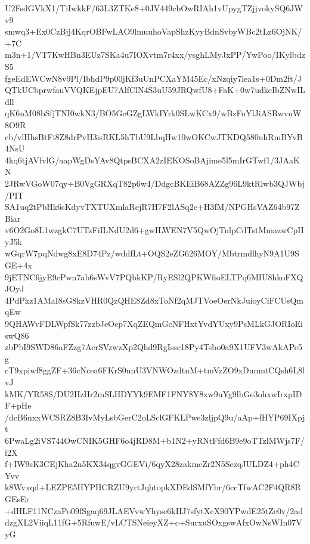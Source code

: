 U2FsdGVkX1/TiIwkkF/63L3ZTKe8+0JV449cbOwRIAh1vUpygTZjjvokySQ6JWv9
smwq3+Ex0CzBjj4KqrOBFwLAO9lmuuhoVapShzKyyBdnSvbyWBc2tLz6OjNK/+7C
m3n+1/VT7KwHBn3EUz7SKa4u7IOXvtm7r4xx/ysghLMyJxPP/YwPoo/IKylbdzS5
fgeEdEWCwN8v9Pl/IbhdP9p00jKf3uUnPCXaYM45Ec/xNzqiy7lea1s+0Dm2ft/J
QTkUCbprwfauVVQKEjpEU7AlfClN4S3uU59JRQwfU8+FaK+0w7udkeIbZNwILdll
qK6nM08bSfjTNI0wkN3/BO5GeGZgLWkIYrk0SLwKCx9/wBzFuYlJiASRwvuW8O9R
cb/vlHhsBtFi8Z8drPvH3isRKL5hTbU9LbqHw10wOKCwJTKDQ580uhRmBYvB4NsU
4kq6tjAVfvlG/aapWgDsYAv8QtpsBCXA2zIEKOSoBAjime5l5mIrGTwf1/3JAaKN
2JRwVGoW07qy+B0VgGRXqT82p6w4/DdgcBKEiB68AZZg96L9ktRlwb3QJWbj/PIT
SA1uq2tPbHk6sKdyvTXTUXmlaRejR7H7F2lASq2c+H3fM/NPGHsVAZ64b97ZBiar
v6O2Go8L1wzgkC7UTzFiILNdU2d6+gwILWEN7V5QwOjTnlpCdTstMmazwCpHyJ5k
wGqrW7pqNdwg8xE8D74Pz/wddfLt+OQS2eZG626MOY/MbtrmdlhyN9A1U9SGE+4x
9jETNC6jyE9cPwn7ab6sWvV7PQbkKP/RyESl2QPKWfioELTPq6MIU8hkoFXQJOyJ
4PdPkz1AMaI8sG8kzVHR0QzQHE8Zd8xToNf2qMJTVoeOerNkJuioyCiFCUsQmqEw
9QHAWvFDLWpfSk77zzbJeOep7XqZEQmGcNFHxtYvdYUxy9PsMLkGJORIoEiswQ86
zbPbI9SWD86aFZzg7AcrSVzwzXp2Qhd9RgIssc18Py4Tsbo0a9X1UFV3wAkAPe5g
cT9xpiwf8ggZF+36cNcea6FKrS0unU3VNWOzdtnM+tmVzZO9xDunmtCQsh6L8lvJ
kMK/YR58S/DU2HzHr2mSLHDYYk9EMF1FNY8Y8xw9uYg9lbGe3ohxwIrxpIDF+pHe
/dcB6nxxWCSRZ8B3IvMyLsbGerC2oLSclGFKLPwe3zljpQ9u/aAp+fHYP69IXpjt
6PwaLg2iVS744OwCNIK5GHF6o4jRD8M+b1N2+yRNtFfd6B9e9oTTzlMWjs7F/i2X
f+IW9sK3CEjKha2n5KX34qgvGGEVi/6qyX28zakmeZr2N5SezqJULDZ4+ph4CYvv
k8Wvxqd+LEZPE5HYPHCRZU9yrtJqhtopkXDEdSMfYbr/6ccTfwAC2F4QR8RGEsEr
+dHLF11NCzaPo09fSgaq69JLAEVvwYhyse6kHJ7sfytXcX90YPwdE25tZe0v/2ad
dzgXL2ViiqL11fG+5RfuwE/vLCTSNeieyXZ+c+SurxuSOxgswAfxOwNsWIn07VyG
